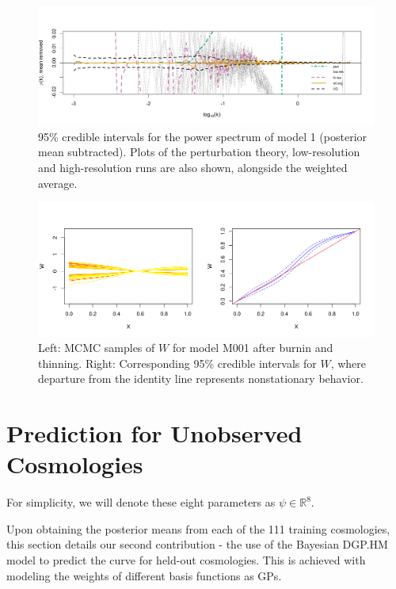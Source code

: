 \documentclass[11pt]{article}
\begin{document}
\begin{figure}[ht]
    \centering
    \includegraphics[width=6in]{plot_fit.png}
    \caption{95\% credible intervals for the power spectrum of model 1 (posterior mean 
             subtracted). Plots of the perturbation theory, low-resolution and high-resolution 
             runs are also shown, alongside the weighted average.}
    \label{fig:plot_fit}
\end{figure}

\begin{figure}[ht]
   \centering
   \includegraphics[width=6in]{plot_warp_M001.png}
   \caption{Left: MCMC samples of $W$ for model M001 after burnin and thinning. 
            Right: Corresponding 95\% credible intervals for $W$, where departure 
            from the identity line represents nonstationary behavior.}
   \label{fig:plot_warp}
\end{figure}

\section{Prediction for Unobserved Cosmologies}
\label{sec:pred}

For simplicity, we will denote these eight parameters as $\psi \in \mathbb{R}^8$.


Upon obtaining the posterior means from each of the 111 training cosmologies, this 
section details our second contribution - the use of the Bayesian DGP.HM model 
to predict the curve for held-out cosmologies. This is achieved with modeling the 
weights of different basis functions as GPs.
\end{document}
